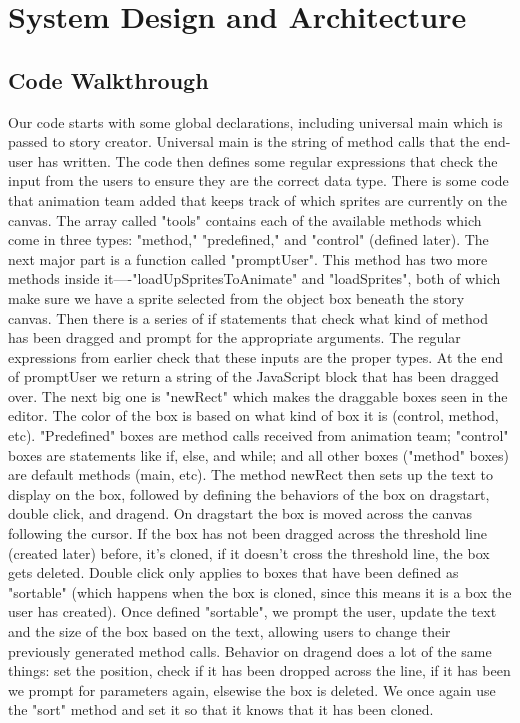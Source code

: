 \documentclass[a4paper]{article}
\begin{document}
\section{System Design and Architecture}
\subsection{Code Walkthrough}
Our code starts with some global declarations, including universal main which is passed to story creator. Universal main is the string of method calls that the end-user has written.  The code then defines some regular expressions that check the input from the users to ensure they are the correct data type. There is some code that animation team added that keeps track of which sprites are currently on the canvas. The array called "tools" contains each of the available methods which come in three types: "method," "predefined," and "control" (defined later). The next major part is a function called "promptUser". This method has two more methods inside it—-"loadUpSpritesToAnimate" and "loadSprites", both of which make sure we have a sprite selected from the object box beneath the story canvas. Then there is a series of if statements that check what kind of method has been dragged and prompt for the appropriate arguments. The regular expressions from earlier check that these inputs are the proper types. At the end of promptUser we return a string of the JavaScript block that has been dragged over. \newline \newline 
The next big one is "newRect" which makes the draggable boxes seen in the editor. The color of the box is based on what kind of box it is (control, method, etc). "Predefined" boxes are method calls received from animation team; "control" boxes are statements like if, else, and while; and all other boxes ("method" boxes) are default methods (main, etc). The method newRect then sets up the text to display on the box, followed by defining the behaviors of the box on dragstart, double click, and dragend. On dragstart the box is moved across the canvas following the cursor. If the box has not been dragged across the threshold line (created later) before, it's cloned, if it doesn't cross the threshold line, the box gets deleted. Double click only applies to boxes that have been defined as "sortable" (which happens when the box is cloned, since this means it is a box the user has created). Once defined "sortable", we prompt the user, update the text and the size of the box based on the text, allowing users to change their previously generated method calls. Behavior on dragend does a lot of the same things: set the position, check if it has been dropped across the line, if it has been we prompt for parameters again, elsewise the box is deleted. We once again use the "sort" method and set it so that it knows that it has been cloned.\newline \newline 
\end{document}
